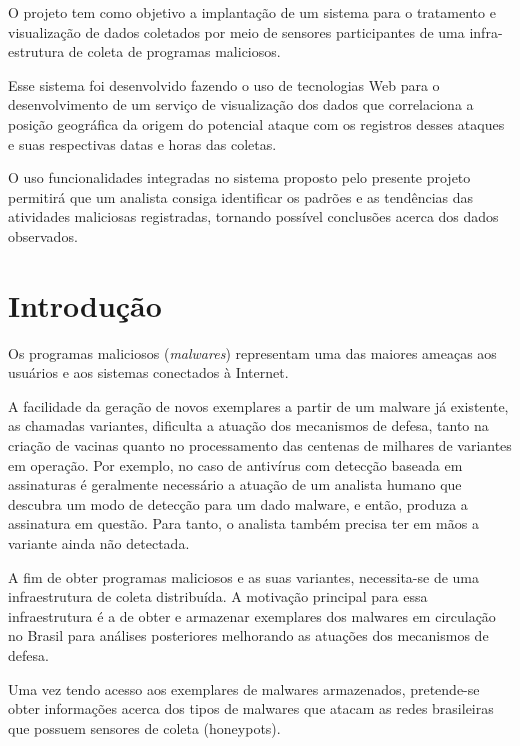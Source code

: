 \documentclass[Portuguese]
{ic-tese-v2}
\begin{document}
\author{Alexandre Or Cansian Baruque}

\beforepreface
\begin{oresumo}
O projeto tem como objetivo a implantação de um sistema para o tratamento e visualização de dados coletados por meio de sensores participantes de uma infra-estrutura de coleta de programas maliciosos.

Esse sistema foi desenvolvido fazendo o uso de tecnologias Web para o desenvolvimento de um serviço de visualização dos dados que correlaciona a posição geográfica da origem do potencial ataque com os registros desses ataques e suas respectivas datas e horas das coletas.

O uso funcionalidades integradas no sistema proposto pelo presente projeto permitirá que um analista consiga identificar os padrões e as tendências das atividades maliciosas registradas, tornando possível conclusões acerca dos dados observados.
\end{oresumo}
\afterpreface   


\chapter{Introdução}
Os programas maliciosos (\emph{malwares}) representam uma das maiores ameaças aos usuários e aos sistemas conectados à Internet. 

A facilidade da geração de novos exemplares a partir de um malware já existente, as chamadas variantes, dificulta a atuação dos mecanismos de defesa, tanto na criação de vacinas quanto no processamento das centenas de milhares de variantes em operação. Por exemplo, no caso de antivírus com detecção baseada em assinaturas é geralmente necessário a atuação de um analista humano que descubra um modo de detecção para um dado malware, e  então, produza a assinatura em questão. Para tanto, o analista também precisa ter em mãos a variante ainda não detectada.

A fim de obter programas maliciosos e as suas variantes, necessita-se de uma infraestrutura de coleta distribuída. A motivação principal para essa infraestrutura é a de obter e armazenar exemplares dos malwares em circulação no Brasil para análises posteriores melhorando as atuações dos mecanismos de defesa. 

Uma vez tendo acesso aos exemplares de malwares armazenados, pretende-se obter informações acerca dos tipos de malwares que atacam as redes brasileiras que possuem sensores de coleta (honeypots)\cite{certhoney}. 
\end{document}
